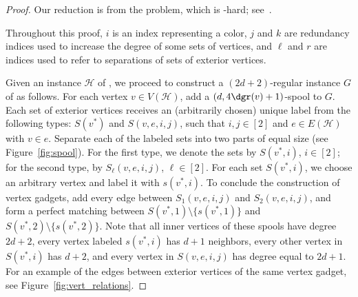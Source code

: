 \begin{proof}
Our reduction is from the  problem, which is \NP-hard; see~\cite{lovasz_hypergraph}. %


    Throughout this proof, $i$ is an index representing a color, $j$ and $k$ are redundancy indices used to increase the degree of some sets of vertices, and $\ell$ and $r$ are indices used to refer to separations of sets of exterior vertices.

    Given an instance $\mathcal{H}$ of , we proceed to construct a $(2d+2)$-regular instance $G$ of  as follows. For each vertex $v \in V(\mathcal{H})$, add a $(d,4\dgr(v) + 1)$-spool to $G$.
    Each set of exterior vertices receives an (arbitrarily chosen) unique label from the following types: $S(v^*)$ and $S(v, e, i, j)$, such that $i,j \in [2]$ and $e \in E(\mathcal{H})$ with $v \in e$.
    Separate each of the labeled sets into two parts of equal size (see Figure~\ref{fig:spool}).
    For the first type, we denote the sets by $S(v^*, i)$, $i \in [2]$; for the second type, by $S_{\ell}(v, e, i, j)$, $\ell \in [2]$.
    For each set $S(v^*, i)$, we choose an arbitrary vertex and label it with $s(v^*, i)$.
    To conclude the construction of vertex gadgets, add every edge between $S_1(v, e, i, j)$ and $S_2(v, e, i, j)$, and form a perfect matching between $S(v^*, 1) \setminus \{s(v^*, 1)\}$ and $S(v^*, 2) \setminus \{s(v^*, 2)\}$.
    Note that all inner vertices of these spools have degree $2d+2$, every vertex labeled $s(v^*, i)$ has $d+1$ neighbors, every other vertex in $S(v^*, i)$ has $d+2$, and every vertex in $S(v, e, i, j)$ has degree equal to $2d+1$.
    For an example of the edges between exterior vertices of the same vertex gadget, see Figure~\ref{fig:vert_relations}.


\end{proof}
